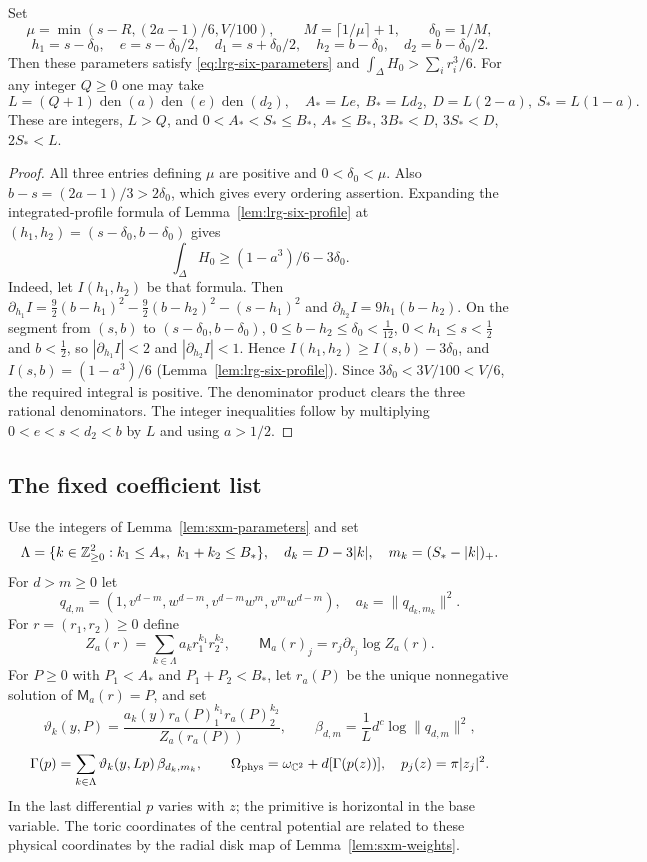 \begin{lemma}\label{lem:sxm-parameters}
Set
\[
 \mu=\min(s-R,(2a-1)/6,V/100),\qquad
 M=\lceil1/\mu\rceil+1,\qquad \delta_0=1/M,
\]
\[
 h_1=s-\delta_0,\quad e=s-\delta_0/2,\quad d_1=s+\delta_0/2,
 \quad h_2=b-\delta_0,\quad d_2=b-\delta_0/2.
\]
Then these parameters satisfy \eqref{eq:lrg-six-parameters} and
$\int_\Delta H_0>\sum_i r_i^3/6$.
For any integer $Q\ge0$ one may take
\[
 L=(Q+1)\operatorname{den}(a)\operatorname{den}(e)\operatorname{den}(d_2),
 \quad A_*=Le,\ B_*=Ld_2,\ D=L(2-a),\ S_*=L(1-a).
\]
These are integers, $L>Q$, and
$0<A_*<S_*\le B_*$, $A_*\le B_*$, $3B_*<D$, $3S_*<D$, $2S_*<L$.
\end{lemma}

\begin{proof}
All three entries defining $\mu$ are positive and $0<\delta_0<\mu$.
Also $b-s=(2a-1)/3>2\delta_0$, which gives every ordering assertion.
Expanding the integrated-profile formula of Lemma~\ref{lem:lrg-six-profile} at
$(h_1,h_2)=(s-\delta_0,b-\delta_0)$ gives
\[
 \int_\Delta H_0\ge(1-a^3)/6-3\delta_0.
\]
Indeed, let $I(h_1,h_2)$ be that formula. Then
$\partial_{h_1}I=\frac92(b-h_1)^2-\frac92(b-h_2)^2-(s-h_1)^2$ and $\partial_{h_2}I=9h_1(b-h_2)$. On the segment from $(s,b)$ to
$(s-\delta_0,b-\delta_0)$, $0\le b-h_2\le\delta_0<\frac1{12}$, $0<h_1\le s<\frac12$ and $b<\frac12$, so
$|\partial_{h_1}I|<2$ and $|\partial_{h_2}I|<1$. Hence $I(h_1,h_2)\ge I(s,b)-3\delta_0$, and $I(s,b)=(1-a^3)/6$
(Lemma~\ref{lem:lrg-six-profile}).
Since $3\delta_0<3V/100<V/6$, the required integral is positive.
The denominator product clears the three rational denominators. The integer
inequalities follow by multiplying $0<e<s<d_2<b$ by $L$ and using $a>1/2$.
\end{proof}

\subsection{The fixed coefficient list}\label{sec:sxm-weights}

\begin{definition}\label{def:sxm-data}
Use the integers of Lemma~\ref{lem:sxm-parameters} and set
\[
 \Lambda=\{k\in\Z_{\ge0}^2:k_1\le A_*,\ k_1+k_2\le B_*\},\quad
 d_k=D-3|k|,\quad m_k=(S_*-|k|)_+.
\]
For $d>m\ge0$ let
\[
 q_{d,m}=(1,v^{d-m},w^{d-m},v^{d-m}w^m,v^mw^{d-m}),\quad a_k=\|q_{d_k,m_k}\|^2.
\]
For $r=(r_1,r_2)\ge0$ define
\[
 Z_a(r)=\sum_{k\in\Lambda}a_kr_1^{k_1}r_2^{k_2},\qquad
 \mathsf M_a(r)_j=r_j\partial_{r_j}\log Z_a(r).
\]
For $P\ge0$ with $P_1<A_*$ and $P_1+P_2<B_*$, let $r_a(P)$ be the unique
nonnegative solution of $\mathsf M_a(r)=P$, and set
\[
 \vartheta_k(y,P)=\frac{a_k(y)r_a(P)_1^{k_1}r_a(P)_2^{k_2}}{Z_a(r_a(P))},\qquad
 \beta_{d,m}=\frac1L d^c\log\|q_{d,m}\|^2,
\]
\[
 \Gamma(p)=\sum_{k\in\Lambda}\vartheta_k(y,Lp)\,\beta_{d_k,m_k},\qquad
 \Omega_{\rm phys}=\omega_{\mathbb{C}^2}+d[\Gamma(p(z))],\quad p_j(z)=\pi|z_j|^2.
\]
In the last differential $p$ varies with $z$; the primitive is horizontal in the base
variable. The toric coordinates of the central potential are related to these physical
coordinates by the radial disk map of Lemma~\ref{lem:sxm-weights}.
\end{definition}

